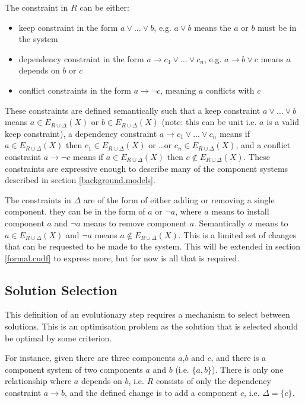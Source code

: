 The constraint in $R$ can be either: 
\begin{itemize}
  \item keep constraint in the form $a \vee \ldots \vee b$, e.g. $a \vee b$ means the $a$ or $b$ must be in the system
  \item dependency constraint in the form $a \rightarrow c_1 \vee \ldots \vee c_n$, e.g. $a \rightarrow b \vee c$ means $a$ depends on $b$ or $c$
  \item conflict constraints in the form $a \rightarrow \neg c$, meaning $a$ conflicts with $c$
\end{itemize}
These constraints are defined semantically such that
a keep constraint  $a \vee \ldots \vee b$ means $a \in E_{R \cup \Delta}(X)$ or $b \in E_{R \cup \Delta}(X)$ (note: this can be unit i.e. $a$ is a valid keep constraint),
a dependency constraint $a \rightarrow c_1 \vee \ldots \vee c_n$ means if $a \in E_{R \cup \Delta}(X)$ then $c_1 \in E_{R \cup \Delta}(X)$ or \ldots or $c_n \in E_{R \cup \Delta}(X)$,
and a conflict constraint $a \rightarrow \neg c$ means if $a \in E_{R \cup \Delta}(X)$ then $c \not \in E_{R \cup \Delta}(X)$.
These constraints are expressive enough to describe many of the component systems described in section \ref{background.models}.

The constraints in $\Delta$ are of the form of either adding or removing a single component.
they can be in the form of $a$ or $\neg a$, where $a$ means to install component $a$ and $\neg a$ means to remove component $a$.
Semantically $a$ means to $a \in E_{R \cup \Delta}(X)$ and $\neg a$ means $a \not \in E_{R \cup \Delta}(X)$. 
This is a limited set of changes that can be requested to be made to the system.
This will be extended in section \ref{formal.cudf} to express more, but for now is all that is required.

\subsection{Solution Selection}
\label{formal.solsel}
This definition of an evolutionary step requires a mechanism to select between solutions.
This is an optimisation problem as the solution that is selected should be optimal by some criterion.

For instance, given there are three components $a$,$b$ and $c$, and there is a component system of two components $a$ and $b$ (i.e. $\{a,b\}$).
There is only one relationship where $a$ depends on $b$, i.e. $R$ consists of only the dependency constraint $a \rightarrow b$,
and the defined change is to add a component $c$, i.e. $\Delta = \{c\}$.

